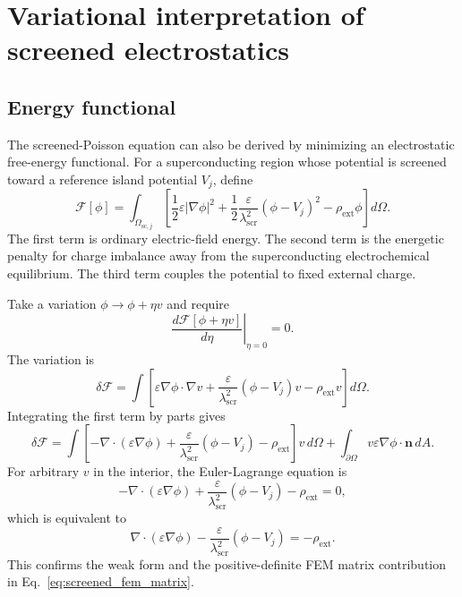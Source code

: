 \documentclass[11pt]{article}
\newcommand{\nvecb}{\mathbf{n}}
\newcommand{\lams}{\lambda_{\mathrm{scr}}}
\begin{document}
\section{Variational interpretation of screened electrostatics}

\subsection{Energy functional}

The screened-Poisson equation can also be derived by minimizing an electrostatic free-energy functional. For a superconducting region whose potential is screened toward a reference island potential $V_j$, define
\begin{equation}
\mathcal{F}[\phi]
=\int_{\Omega_{\mathrm{sc},j}}\left[\frac{1}{2}\varepsilon |\nabla\phi|^2
+\frac{1}{2}\frac{\varepsilon}{\lams^2}(\phi-V_j)^2
-\rho_{\mathrm{ext}}\phi\right]d\Omega.
\label{eq:screened_energy_functional}
\end{equation}
The first term is ordinary electric-field energy. The second term is the energetic penalty for charge imbalance away from the superconducting electrochemical equilibrium. The third term couples the potential to fixed external charge.

Take a variation $\phi\rightarrow\phi+\eta v$ and require
\begin{equation}
\left.\frac{d\mathcal{F}[\phi+\eta v]}{d\eta}\right|_{\eta=0}=0.
\end{equation}
The variation is
\begin{equation}
\delta\mathcal{F}
=\int \left[\varepsilon\nabla\phi\cdot\nabla v
+\frac{\varepsilon}{\lams^2}(\phi-V_j)v
-\rho_{\mathrm{ext}}v\right]d\Omega.
\end{equation}
Integrating the first term by parts gives
\begin{equation}
\delta\mathcal{F}
=\int\left[-\nabla\cdot(\varepsilon\nabla\phi)
+\frac{\varepsilon}{\lams^2}(\phi-V_j)-\rho_{\mathrm{ext}}\right]v\,d\Omega
+\int_{\partial\Omega}v\varepsilon\nabla\phi\cdot\nvecb\,dA.
\end{equation}
For arbitrary $v$ in the interior, the Euler-Lagrange equation is
\begin{equation}
-\nabla\cdot(\varepsilon\nabla\phi)
+\frac{\varepsilon}{\lams^2}(\phi-V_j)-\rho_{\mathrm{ext}}=0,
\end{equation}
which is equivalent to
\begin{equation}
\nabla\cdot(\varepsilon\nabla\phi)-\frac{\varepsilon}{\lams^2}(\phi-V_j)=-\rho_{\mathrm{ext}}.
\end{equation}
This confirms the weak form and the positive-definite FEM matrix contribution in Eq.~\eqref{eq:screened_fem_matrix}.
\end{document}
